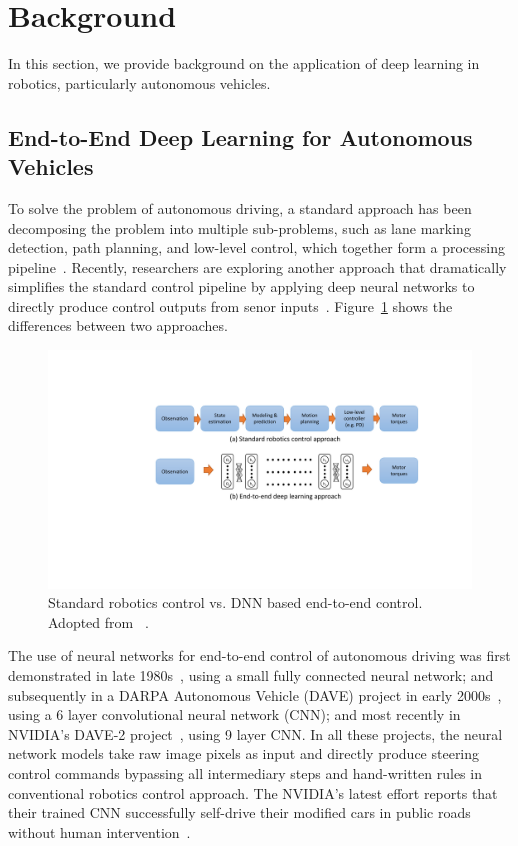 \section{Background} \label{sec:background}

In this section, we provide background on the application of deep
learning in robotics, particularly autonomous vehicles.

\subsection{End-to-End Deep Learning for Autonomous Vehicles}


To solve the problem of autonomous driving, a standard approach has
been decomposing the problem into multiple sub-problems,
such as lane marking detection, path planning, and low-level
control, which together form a processing pipeline~\cite{Bojarski2016}.
Recently, researchers are exploring another approach that dramatically
simplifies the standard control pipeline by applying deep neural
networks to directly produce control outputs from senor
inputs~\cite{Levine2016}. Figure~\ref{fig:end-to-end-control}
shows the differences between two approaches.

\begin{figure}[h]
  \centering
  \includegraphics[width=.5\textwidth]{figs/endtoend_redrawn}
  \caption{Standard robotics control vs. DNN based end-to-end
    control. Adopted from ~\cite{Levine2017cs294}.}
  \label{fig:end-to-end-control}
\end{figure}

The use of neural networks for end-to-end control of autonomous
driving was first demonstrated in late 1980s~\cite{Pomerleau1989},
using a small fully connected neural network; and subsequently in a
DARPA Autonomous Vehicle (DAVE) project in early
2000s~\cite{LeCun:04}, using a 6 layer convolutional neural network
(CNN); and most recently in NVIDIA's DAVE-2
project~\cite{Bojarski2016}, using 9 layer CNN. In all these projects,
the neural network models take raw image pixels as input and directly
produce steering control commands bypassing all intermediary steps and
hand-written rules in conventional robotics control approach. The
NVIDIA's latest effort reports that their trained CNN successfully
self-drive their modified cars in public roads without human
intervention~\cite{Bojarski2016}. 

